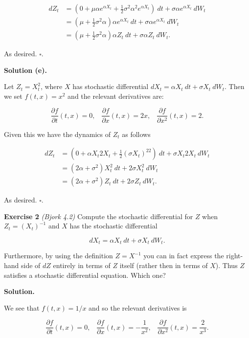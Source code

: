\documentclass[
]{article}
\begin{document}
\begin{align*}
dZ_t&=\left(0+\mu \alpha e^{\alpha X_t}+\frac{1}{2} \sigma^2\alpha^2 e^{\alpha X_t}\right)\ dt+\sigma \alpha e^{\alpha X_t}\ dW_t\\
&=\left(\mu+\frac{1}{2}\sigma^2\alpha\right)\alpha e^{\alpha X_t}\ dt+\sigma \alpha e^{\alpha X_t}\ dW_t\\
&=\left(\mu+\frac{1}{2}\sigma^2\alpha\right)\alpha Z_t\ dt+\sigma \alpha Z_t\ dW_t.
\end{align*}

As desired. \(\square\).

\textbf{Solution (e).}

Let \(Z_t=X_t^2\), where \(X\) has stochastic differential
\(dX_t=\alpha X_t\ dt+\sigma X_t\ dW_t\). Then we set \(f(t,x)=x^2\) and
the relevant derivatives are:

\[
\frac{\partial f}{\partial t}(t,x)=0,\hspace{10pt}\frac{\partial f}{\partial x}(t,x) =2x,\hspace{10pt}\frac{\partial f}{\partial x^2}(t,x) =2.
\]

Given this we have the dynamics of \(Z_t\) as follows

\begin{align*}
dZ_t&=\left(0 + \alpha X_t2X_t+\frac{1}{2}(\sigma X_t)^22\right)\ dt+\sigma X_t 2 X_t\ dW_t\\
&=\left(2\alpha +\sigma^2\right) X_t^2\ dt + 2\sigma X_t^2\ dW_t\\
&=\left(2\alpha +\sigma^2\right) Z_t\ dt + 2\sigma Z_t\ dW_t.
\end{align*}

As desired. \(\square\).

\textbf{Exercise 2} \emph{(Bjork 4.2)} Compute the stochastic
differential for \(Z\) when \(Z_t=(X_t)^{-1}\) and \(X\) has the
stochastic differential

\[
dX_t=\alpha X_t\ dt + \sigma X_t\ dW_t.
\]

Furthermore, by using the definition \(Z=X^{-1}\) you can in fact
express the right-hand side of \(dZ\) entirely in terms of \(Z\) itself
(rather then in terms of \(X\)). Thus \(Z\) satisfies a stochastic
differential equation. Which one?

\textbf{Solution.}

We see that \(f(t,x)=1/x\) and so the relevant derivatives is

\[
\frac{\partial f}{\partial t}(t,x)=0,\hspace{10pt}\frac{\partial f}{\partial x}(t,x) =-\frac{1}{x^2},\hspace{10pt}\frac{\partial f}{\partial x^2}(t,x) =\frac{2}{x^3}.
\]
\end{document}
